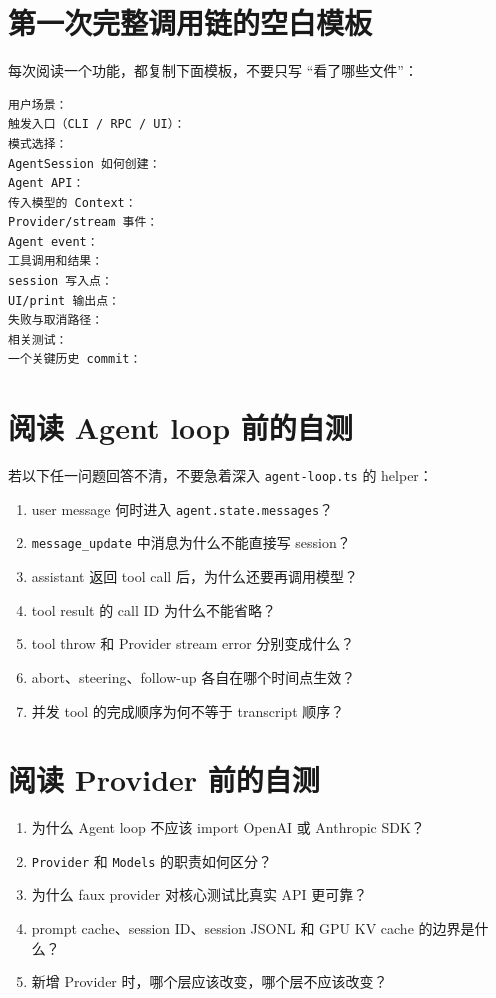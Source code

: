 \documentclass[UTF8,openany,11pt]{ctexbook}
\begin{document}
\section{第一次完整调用链的空白模板}
每次阅读一个功能，都复制下面模板，不要只写 ``看了哪些文件''：
\begin{Verbatim}[fontsize=\small]
用户场景：
触发入口（CLI / RPC / UI）：
模式选择：
AgentSession 如何创建：
Agent API：
传入模型的 Context：
Provider/stream 事件：
Agent event：
工具调用和结果：
session 写入点：
UI/print 输出点：
失败与取消路径：
相关测试：
一个关键历史 commit：
\end{Verbatim}

\section{阅读 Agent loop 前的自测}
若以下任一问题回答不清，不要急着深入 \texttt{agent-loop.ts} 的 helper：
\begin{enumerate}
\item user message 何时进入 \texttt{agent.state.messages}？
\item \texttt{message\_update} 中消息为什么不能直接写 session？
\item assistant 返回 tool call 后，为什么还要再调用模型？
\item tool result 的 call ID 为什么不能省略？
\item tool throw 和 Provider stream error 分别变成什么？
\item abort、steering、follow-up 各自在哪个时间点生效？
\item 并发 tool 的完成顺序为何不等于 transcript 顺序？
\end{enumerate}

\section{阅读 Provider 前的自测}
\begin{enumerate}
\item 为什么 Agent loop 不应该 import OpenAI 或 Anthropic SDK？
\item \texttt{Provider} 和 \texttt{Models} 的职责如何区分？
\item 为什么 faux provider 对核心测试比真实 API 更可靠？
\item prompt cache、session ID、session JSONL 和 GPU KV cache 的边界是什么？
\item 新增 Provider 时，哪个层应该改变，哪个层不应该改变？
\end{enumerate}
\end{document}
